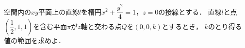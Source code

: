 \documentclass[../../main.tex]{subfiles}
\begin{document}
空間内の$xy$平面上の直線$l$を楕円$\displaystyle x^2+\dfrac{y^2}{4}=1$，$z=0$の接線とする．
直線$l$と点$\displaystyle \left( \dfrac{1}{2},1,1 \right) $を含む平面$\pi$が$z$軸と交わる点$Q$を$(0,0,k)$とするとき，
$k$のとり得る値の範囲を求めよ．
\end{document}
